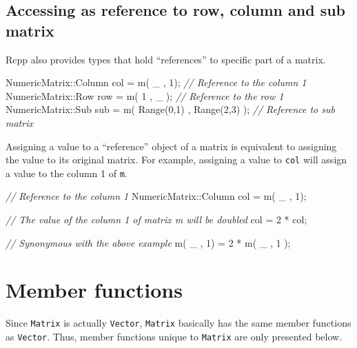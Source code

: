 \documentclass[]{book}
\newenvironment{Shaded}{\begin{snugshade}}{\end{snugshade}}
\newcommand{\CommentTok}[1]{\textcolor[rgb]{0.56,0.35,0.01}{\textit{#1}}}
\newcommand{\DecValTok}[1]{\textcolor[rgb]{0.00,0.00,0.81}{#1}}
\newcommand{\NormalTok}[1]{#1}
\begin{document}
\hypertarget{accessing-as-reference-to-row-column-and-sub-matrix}{%
\subsection{Accessing as reference to row, column and sub matrix}\label{accessing-as-reference-to-row-column-and-sub-matrix}}

Rcpp also provides types that hold ``references'' to specific part of a matrix.

\begin{Shaded}
\begin{Highlighting}[]
\NormalTok{NumericMatrix::Column col = m( _ , }\DecValTok{1}\NormalTok{);  }\CommentTok{// Reference to the column 1}
\NormalTok{NumericMatrix::Row    row = m( }\DecValTok{1}\NormalTok{ , _ ); }\CommentTok{// Reference to the row 1}
\NormalTok{NumericMatrix::Sub    sub = m( Range(}\DecValTok{0}\NormalTok{,}\DecValTok{1}\NormalTok{) , Range(}\DecValTok{2}\NormalTok{,}\DecValTok{3}\NormalTok{) ); }\CommentTok{// Reference to sub matrix}
\end{Highlighting}
\end{Shaded}

Assigning a value to a ``reference'' object of a matrix is equivalent to assigning the value to its original matrix. For example, assigning a value to \texttt{col} will assign a value to the column 1 of \texttt{m}.

\begin{Shaded}
\begin{Highlighting}[]
\CommentTok{// Reference to the column 1}
\NormalTok{NumericMatrix::Column col = m( _ , }\DecValTok{1}\NormalTok{);  }

\CommentTok{// The value of the column 1 of matrix m will be doubled}
\NormalTok{col = }\DecValTok{2}\NormalTok{ * col;}

\CommentTok{// Synonymous with the above example}
\NormalTok{m( _ , }\DecValTok{1}\NormalTok{) = }\DecValTok{2}\NormalTok{ * m( _ , }\DecValTok{1}\NormalTok{ );}
\end{Highlighting}
\end{Shaded}

\hypertarget{member-functions-1}{%
\section{Member functions}\label{member-functions-1}}

Since \texttt{Matrix} is actually \texttt{Vector}, \texttt{Matrix} basically has the same member functions as \texttt{Vector}. Thus, member functions unique to \texttt{Matrix} are only presented below.
\end{document}
